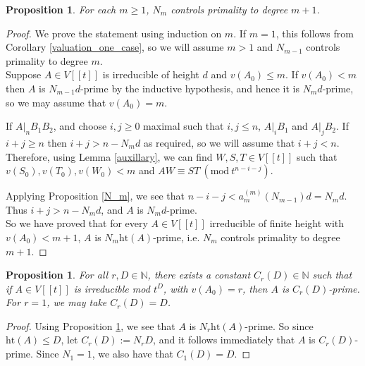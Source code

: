 \documentclass{article}
\newcommand{\Mod}[1]{\ (\mathrm{mod}\ #1)}
\theoremstyle{plain}
\newtheorem{proposition}[theorem]{Proposition}
\theoremstyle{definition}
\theoremstyle{remark}
\theoremstyle{plain}
\begin{document}
\begin{proposition}\label{irred implies prime (finite height)}
For each $m\geq 1$, $N_m$ controls primality to degree $m+1$.
    
\end{proposition}
\begin{proof}
We prove the statement using induction on $m$. If $m=1$, this follows from Corollary \ref{valuation_one_case}, so we will assume $m>1$ and $N_{m-1}$ controls primality to degree $m$.\\

\noindent Suppose $A\in V[[t]]$ is irreducible of height $d$ and $v(A_0)\leq m$. If $v(A_0)<m$ then $A$ is $N_{m-1}d$-prime by the inductive hypothesis, and hence it is $N_md$-prime, so we may assume that $v(A_0)=m$.

If $A|_nB_1B_2$, and choose $i,j\geq 0$ maximal such that $i,j\leq n$, $A|_iB_1$ and $A|_jB_2$. If $i+j\geq n$ then $i+j>n-N_md$ as required, so we will assume that $i+j<n$. Therefore, using Lemma \ref{auxillary}, we can find $W,S,T\in V[[t]]$ such that $v(S_0),v(T_0),v(W_0)<m$ and $AW\equiv ST\Mod{t^{n-i-j}}$.

Applying Proposition \ref{N_m}, we see that $n-i-j< a_m^{(m)}(N_{m-1})d=N_md$. Thus $i+j>n-N_md$, and $A$ is $N_md$-prime.\\

\noindent So we have proved that for every $A\in V[[t]]$ irreducible of finite height with $v(A_0)<m+1$, $A$ is $N_m\text{ht}(A)$-prime, i.e. $N_m$ controls primality to degree $m+1$.\end{proof}

\begin{proposition}\label{quasi-prime}
For all $r,D\in\mathbb{N}$, there exists a constant $C_r(D)\in\mathbb{N}$ such that if $A\in V[[t]]$ is irreducible mod $t^D$, with $v(A_0)=r$, then $A$ is $C_r(D)$-prime. For $r=1$, we may take $C_r(D)=D$.
\end{proposition}

\begin{proof}

Using Proposition \ref{irred implies prime (finite height)}, we see that $A$ is $N_r\text{ht}(A)$-prime. So since $\text{ht}(A)\leq D$, let $C_r(D):=N_rD$, and it follows immediately that $A$ is $C_r(D)$-prime. Since $N_1=1$, we also have that $C_1(D)=D$.\end{proof}


    
\end{document}
